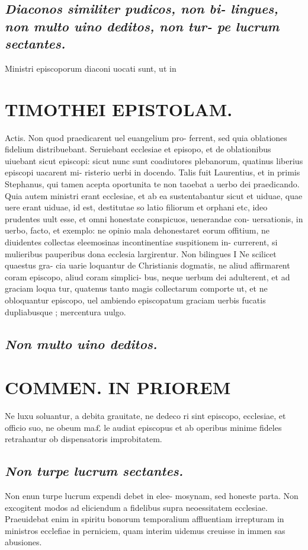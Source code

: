 \documentclass{article}
\begin{document}
\begin{pages}
\subsection*{\textit{Diaconos similiter pudicos, non bi- lingues, non multo uino deditos, non tur- pe lucrum sectantes. }}\pstart Ministri episcoporum diaconi uocati sunt, ut in  \pend
\section*{TIMOTHEI EPISTOLAM. }
\marginpar{[ p.81 ]}\pstart Actis. Non quod praedicarent uel euangelium pro- ferrent, sed quia oblationes fidelium distribuebant. Seruiebant ecclesiae et episopo, et de oblationibus uiuebant sicut episcopi: sicut nunc sunt coadiutores plebanorum, quatinus liberius episcopi uacarent mi- risterio uerbi in docendo. Talis fuit Laurentius, et in primis Stephanus, qui tamen acepta oportunita te non taoebat a uerbo dei praedicando. Quia autem ministri erant ecclesiae, et ab ea sustentabantur sicut et uiduae, quae uere erant uiduae, id est, destitutae so latio filiorum et orphani etc, ideo prudentes uult esse, et omni honestate conspicuos, uenerandae con- uersationis, in uerbo, facto, et exemplo: ne opinio mala dehonestaret eorum offitium, ne diuidentes collectas eleemosinas incontinentiae suspitionem in- currerent, si mulieribus pauperibus dona ecclesia largirentur.  \pend\pstart Non bilingues I Ne scilicet quaestus gra- cia uarie loquantur de Christianis dogmatis, ne aliud affirmarent coram episcopo, aliud coram simplici- bus, neque uerbum dei adulterent, et ad graciam loqua tur, quatenus tanto magis collectarum comporte ut, et ne obloquantur episcopo, uel ambiendo episcopatum graciam uerbis fucatis dupliabusque ; mercentura uulgo.  \pend
{}
{}
\subsection*{\textit{Non multo uino deditos. }}
\section*{COMMEN. IN PRIOREM }
\marginpar{[ p.82 ]}\pstart Ne luxu soluantur, a debita grauitate, ne dedeco ri sint episcopo, ecclesiae, et officio suo, ne obeum ma£ le audiat episcopus et ab operibus minime fideles retrahantur ob dispensatoris improbitatem.  \pend
{}
{}
\subsection*{\textit{Non turpe lucrum sectantes. }}\pstart Non enun turpe lucrum expendi debet in elee- mosynam, sed honeste parta. Non excogitent modos ad eliciendum a fidelibus supra neoessitatem ecclesiae. Praeuidebat enim in spiritu bonorum temporalium affluentiam irrepturam in ministros ecclefiae in perniciem, quam interim uidemus creuisse in immen sas abusiones.  \pend
{}
{}

\end{pages}
\end{document}
